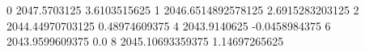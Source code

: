 0 2047.5703125 3.6103515625
1 2046.6514892578125 2.6915283203125
2 2044.44970703125 0.48974609375
4 2043.9140625 -0.0458984375
6 2043.9599609375 0.0
8 2045.10693359375 1.14697265625
